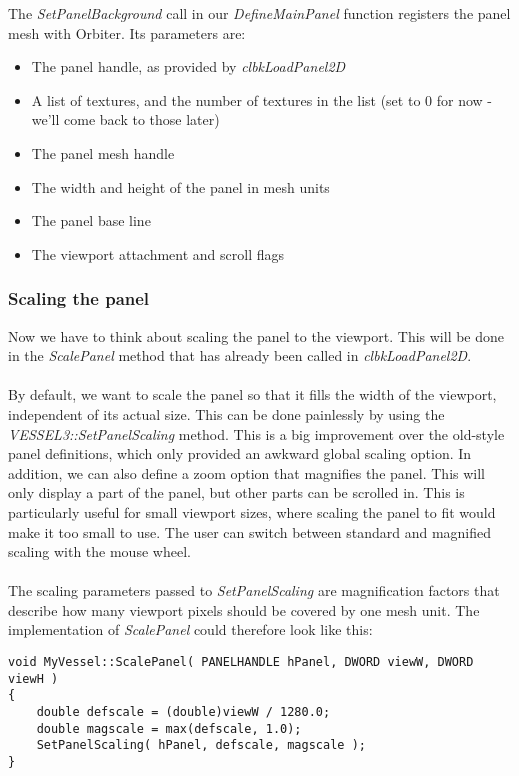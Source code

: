 \documentclass[Orbiter Developer Manual.tex]{subfiles}
\begin{document}
\noindent
The \textit{SetPanelBackground} call in our \textit{DefineMainPanel} function registers the panel mesh with Orbiter. Its parameters are:

\begin{itemize}
\item The panel handle, as provided by \textit{clbkLoadPanel2D}
\item A list of textures, and the number of textures in the list (set to 0 for now - we'll come back to those later)
\item The panel mesh handle
\item The width and height of the panel in mesh units
\item The panel base line
\item The viewport attachment and scroll flags
\end{itemize}


\subsubsection{Scaling the panel}
Now we have to think about scaling the panel to the viewport. This will be done in the \textit{ScalePanel} method that has already been called in \textit{clbkLoadPanel2D}.\\
\\
By default, we want to scale the panel so that it fills the width of the viewport, independent of its actual size. This can be done painlessly by using the \textit{VESSEL3::SetPanelScaling} method. This is a big improvement over the old-style panel definitions, which only provided an awkward global scaling option. In addition, we can also define a zoom option that magnifies the panel. This will only display a part of the panel, but other parts can be scrolled in. This is particularly useful for small viewport sizes, where scaling the panel to fit would make it too small to use. The user can switch between standard and magnified scaling with the mouse wheel.\\
\\
The scaling parameters passed to \textit{SetPanelScaling} are magnification factors that describe how many viewport pixels should be covered by one mesh unit. The implementation of \textit{ScalePanel} could therefore look like this:

\begin{lstlisting}
void MyVessel::ScalePanel( PANELHANDLE hPanel, DWORD viewW, DWORD viewH )
{
	double defscale = (double)viewW / 1280.0;
	double magscale = max(defscale, 1.0);
	SetPanelScaling( hPanel, defscale, magscale );
}
\end{lstlisting}
\end{document}
